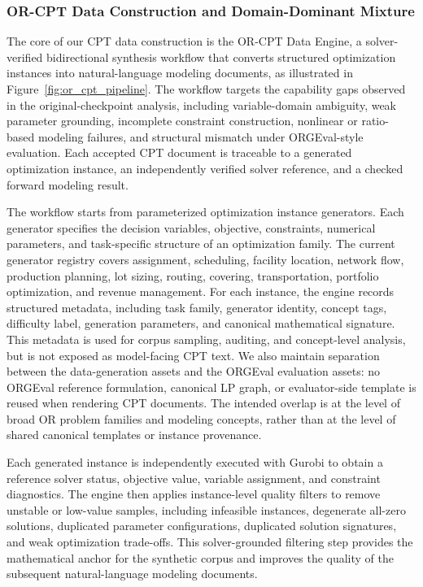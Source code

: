 \subsubsection{OR-CPT Data Construction and Domain-Dominant Mixture}
\label{subsubsec:cpt_data_construction}

The core of our CPT data construction is the OR-CPT Data Engine, a
solver-verified bidirectional synthesis workflow that converts structured
optimization instances into natural-language modeling documents, as illustrated
in Figure~\ref{fig:or_cpt_pipeline}. The workflow
targets the capability gaps observed in the original-checkpoint analysis,
including variable-domain ambiguity, weak parameter grounding, incomplete
constraint construction, nonlinear or ratio-based modeling failures, and
structural mismatch under ORGEval-style evaluation. Each accepted CPT document
is traceable to a generated optimization instance, an independently verified
solver reference, and a checked forward modeling result.

The workflow starts from parameterized optimization instance generators. Each
generator specifies the decision variables, objective, constraints, numerical
parameters, and task-specific structure of an optimization family. The current
generator registry covers assignment, scheduling, facility location, network
flow, production planning, lot sizing, routing, covering, transportation,
portfolio optimization, and revenue management. For each instance, the engine records structured metadata, including task family, generator identity, concept tags, difficulty label, generation parameters, and canonical mathematical signature. This metadata is used for corpus sampling, auditing, and concept-level analysis, but is not exposed as model-facing CPT text. We also maintain separation between the data-generation assets and the ORGEval evaluation assets: no ORGEval reference formulation, canonical LP graph, or evaluator-side template is reused when rendering CPT documents. The intended overlap is at the level of broad OR problem families and modeling concepts, rather than at the level of shared canonical templates or instance provenance.


Each generated instance is independently executed with Gurobi to obtain a
reference solver status, objective value, variable assignment, and constraint
diagnostics. The engine then applies instance-level quality filters to remove
unstable or low-value samples, including infeasible instances, degenerate
all-zero solutions, duplicated parameter configurations, duplicated solution
signatures, and weak optimization trade-offs. This solver-grounded filtering
step provides the mathematical anchor for the synthetic corpus and improves the
quality of the subsequent natural-language modeling documents.

